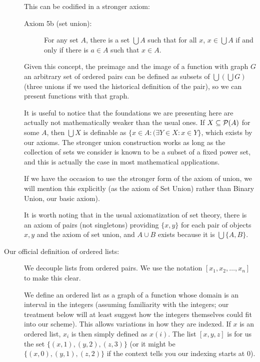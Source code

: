 \documentclass[12pt]{article}
\begin{document}
\begin{description}
This can be codified in a stronger axiom:

\begin{description}

\item[Axiom 5b (set union):]  For any set $A$, there is a set $\bigcup A$ such that for all $x$, $x \in \bigcup A$ if and only if there is $a \in A$ such that $x \in A$.

\end{description}

Given this concept, the preimage and the image of a function with graph $G$ an arbitrary set of ordered pairs can be defined as subsets of $\bigcup(\bigcup G)$ (three unions if we used the historical definition of the pair), so we can present functions with that graph.  

It is useful to notice that the foundations we are presenting here are actually not mathematically weaker than the usual ones.  If $X \subseteq {\cal P}(A)$ for some $A$, then $\bigcup X$ is definable as $\{x \in A:(\exists Y \in X:x \in Y\}$, which exists by our axioms.  The stronger union construction works as long as the collection of sets we consider is known to be a subset of a fixed power set, and this is actually the case in most mathematical applications.

If we have the occasion to use the stronger form of the axiom of union, we will mention this explicitly (as the axiom of Set Union) rather than Binary Union, our basic axiom).

It is worth noting that in the usual axiomatization of set theory, there is an axiom of pairs (not singletons) providing
$\{x,y\}$ for each pair of objects $x,y$ and the axiom of set union, and $A \cup B$ exists because it is $\bigcup \{A,B\}$.

\item[Our official definition of ordered lists:]  We decouple lists from ordered pairs.  We use the notation
$[x_1,x_2,\ldots,x_n]$ to make this clear.

We define an ordered list as a graph of a function whose domain is an interval in the integers (assuming familiarity with the integers;  our treatment below will at least suggest how the integers themselves could fit into our scheme).  This allows variations in how
they are indexed.  If $x$ is an ordered list, $x_i$ is then simply defined as $x(i)$.  The list $[x,y,z]$ is for us
the set $\{(x,1),(y,2),(z,3)\}$ (or it might be $\{(x,0),(y,1),(z,2)\}$ if the context tells you our indexing starts at 0).


\end{description}
\end{document}
